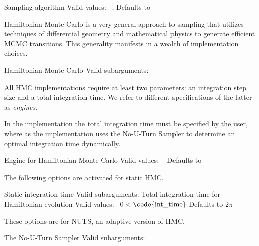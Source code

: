 \begin{description}
      {Sampling algorithm}
      {Valid values: \  ,  }
      {Defaults to }
\end{description}
%
Hamiltonian Monte Carlo is a very general approach to sampling that
utilizes techniques of differential geometry and mathematical physics
to generate efficient MCMC transitions.  This generality manifests in
a wealth of implementation choices.
%
\begin{description}
        {Hamiltonian Monte Carlo}
        {Valid subarguments: }
\end{description}
%
All HMC implementations require at least two parameters: an
integration step size and a total integration time.  We refer to
different specifications of the latter as \textit{engines}.

In the  implementation the total integration time
must be specified by the user, where as the 
implementation uses the No-U-Turn Sampler to determine
an optimal integration time dynamically. 
%
\begin{description}
          {Engine for Hamiltonian Monte Carlo}
          {Valid values: \  }
          {Defaults to }
\end{description}
%
The following options are activated for static HMC.
%
\begin{description}
            {Static integration time}
            {Valid subarguments: }
%
              {Total integration time for Hamiltonian evolution}
              {Valid values: \  $0 < \mbox{\code{int\_time}}$}
              {Defaults to $2\pi$}
\end{description}
%
These options are for NUTS, an adaptive version of HMC.
%
\begin{description}
            {The No-U-Turn Sampler}
            {Valid subarguments: }
%
\end{description}

